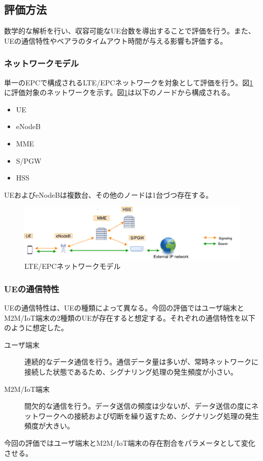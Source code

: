 \documentclass[a4j]{ujarticle}
\begin{document}
\subsection{評価方法}
\label{sec:method}
数学的な解析を行い、収容可能なUE台数を導出することで評価を行う。また、UEの通信特性やベアラのタイムアウト時間が与える影響も評価する。
\subsubsection{ネットワークモデル}
単一のEPCで構成されるLTE/EPCネットワークを対象として評価を行う。図\ref{networkmodel}に評価対象のネットワークを示す。図\ref{networkmodel}は以下のノードから構成される。
\begin{itemize}
  \item UE
  \item eNodeB
  \item MME
  \item S/PGW
	\item HSS
\end{itemize}
UEおよびeNodeBは複数台、その他のノードは1台づつ存在する。
\begin{figure}[htbp]
	\centering
	\includegraphics[width=0.7\hsize]{networkmodel.pdf}
  \caption{LTE/EPCネットワークモデル}
	\label{networkmodel}
\end{figure}
\subsubsection{UEの通信特性}
UEの通信特性は、UEの種類によって異なる。今回の評価ではユーザ端末とM2M/IoT端末の2種類のUEが存在すると想定する。それぞれの通信特性を以下のように想定した。
\begin{description}
  \item[ユーザ端末] 連続的なデータ通信を行う。通信データ量は多いが、常時ネットワークに接続した状態であるため、シグナリング処理の発生頻度が小さい。
  \item[M2M/IoT端末] 間欠的な通信を行う。データ送信の頻度は少ないが、データ送信の度にネットワークへの接続および切断を繰り返すため、シグナリング処理の発生頻度が大きい。
\end{description}
今回の評価ではユーザ端末とM2M/IoT端末の存在割合をパラメータとして変化させる。
\end{document}
